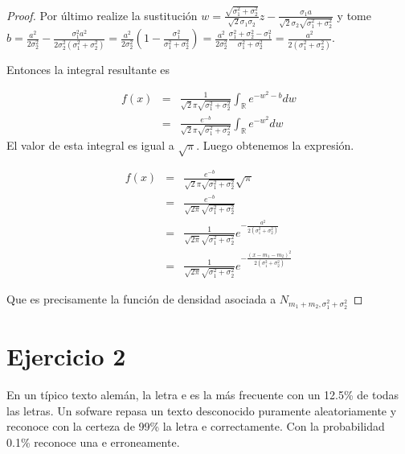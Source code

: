\documentclass[paper=letter, fontsize=11pt]{scrartcl} %
\numberwithin{equation}{section} %
\numberwithin{figure}{section} %
\numberwithin{table}{section} %
\begin{document}
\begin{enumerate}[label = \Alph*)]
\begin{enumerate}[label = \arabic*)]
\begin{proof}
Por último realize la sustitución $ \displaystyle w = \frac{\sqrt{\sigma_1^2+\sigma_2^2}}{\sqrt{2}\sigma_1\sigma_2}z-\frac{\sigma_1a}{\sqrt{2}\sigma_2\sqrt{\sigma_1^2+\sigma_2^2}} $ y tome $ \displaystyle b = \frac{a^2}{2\sigma_2^2}-\frac{\sigma_1^2a^2}{2\sigma_2^2(\sigma_1^2+\sigma_2^2)} =  \frac{a^2}{2\sigma_2^2}(1-\frac{\sigma_1^2}{\sigma_1^2+\sigma_2^2}) =\frac{a^2}{2\sigma_2^2}\frac{\sigma_1^2+\sigma_2^2-\sigma_1^2}{\sigma_1^2+\sigma_2^2} = \frac{a^2}{2(\sigma_1^2+\sigma_2^2)}.$

Entonces la integral resultante es

\begin{eqnarray}
f(x)&=&\frac{1}{\sqrt{2}\pi\sqrt{\sigma_1^2+\sigma_2^2}}\int_{\mathbb{R}}e^{-w^2-b} \nonumber dw
\\&=& \frac{e^{-b}}{\sqrt{2}\pi\sqrt{\sigma_1^2+\sigma_2^2}}\int_{\mathbb{R}}e^{-w^2} \nonumber dw
\end{eqnarray}
El valor de esta integral es igual a $ \sqrt{\pi} $. Luego obtenemos la expresión.

\begin{eqnarray}
f(x)&=&\frac{e^{-b}}{\sqrt{2}\pi\sqrt{\sigma_1^2+\sigma_2^2}}\sqrt{\pi} \nonumber
\\&=&\frac{e^{-b}}{\sqrt{2\pi}\sqrt{\sigma_1^2+\sigma_2^2}}\nonumber
\\&=&\frac{1}{\sqrt{2\pi}\sqrt{\sigma_1^2+\sigma_2^2}}e^{- \frac{a^2}{2(\sigma_1^2+\sigma_2^2)}} \nonumber
\\&=&\frac{1}{\sqrt{2\pi}\sqrt{\sigma_1^2+\sigma_2^2}}e^{- \frac{(x-m_1-m_2)^2}{2(\sigma_1^2+\sigma_2^2)}} \nonumber
\end{eqnarray}

Que es precisamente la función de densidad asociada a $ N_{m_1+m_2,\sigma_1^2+\sigma_2^2} $
\end{proof}
\end{enumerate}
\end{enumerate}

\section{Ejercicio 2}

En un típico texto alemán, la letra  e  es la más frecuente con un 12.5\% de todas las letras. Un sofware repasa un texto desconocido  puramente aleatoriamente  y reconoce con la certeza de 99\% la letra  e  correctamente. Con la probabilidad 0.1\% reconoce una  e  erroneamente.
\end{document}
